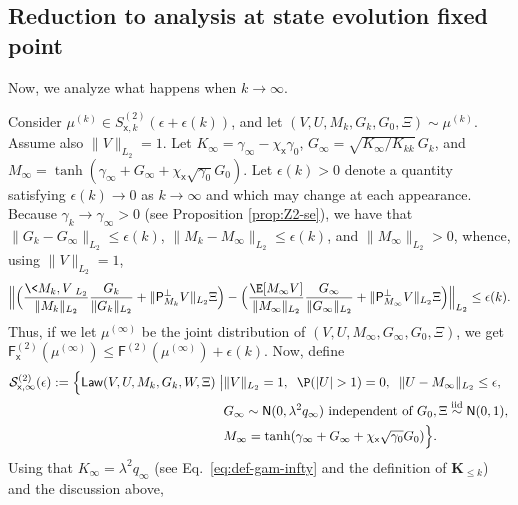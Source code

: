 \documentclass[]{article}
\def\sx{{\mathsf x}}
\def\normal{{\sf N}}
\def\proj{{\mathsf P}}
\def\proj{{\mathsf P}}
\def\normal{{\sf N}}
\def\cS{{\mathcal S}}
\def\cS{{\mathcal S}}
\def\bK{\boldsymbol{K}}
\def\sF{\mathsf{F}}
\def\Law{\mathsf{Law}}
\begin{document}
\subsection{Reduction to analysis at state evolution fixed point}

Now, we analyze what happens when $k \rightarrow \infty$.

Consider $\mu^{(k)} \in S^{(2)}_{\sx,k}(\epsilon + \epsilon(k))$,
and let $(V,U,M_k,G_k,G_0,\Xi) \sim \mu^{(k)}$.
Assume also $\| V \|_{L_2} = 1$.
Let $K_\infty = \gamma_\infty - \chi_{\sx} \gamma_0$,
$G_\infty = \sqrt{K_\infty/K_{kk}}\, G_k$,
and $M_\infty = \tanh(\gamma_\infty + G_\infty + \chi_{\sx} \sqrt{\gamma_0}G_0)$.
Let $\epsilon(k) > 0$ denote a quantity satisfying $\epsilon(k) \rightarrow 0$ as $k\rightarrow \infty$
and which may change at each appearance.
Because $\gamma_k \rightarrow \gamma_\infty > 0$ (see Proposition \ref{prop:Z2-se}),
we have that $\| G_k - G_\infty \|_{L_2} \leq \epsilon(k)$, $\| M_k - M_\infty \|_{L_2} \leq \epsilon(k)$, and $\| M_\infty \|_{L_2} > 0$,
whence, using $\|V\|_{L_2} = 1$,
\begin{equation}
    \Big\|
        \Big(\frac{\<M_k,V\>_{L_2}}{\| M_k \|_{L_2}} \frac{G_k}{\|G_k\|_{L_2}} + \| \proj_{M_k}^\perp V \|_{L_2} \Xi\Big)
        -
        \Big(\frac{\E[M_\infty V]}{\| M_\infty \|_{L_2}} \frac{G_\infty}{\|G_\infty\|_{L_2}} + \| \proj_{M_\infty}^\perp V \|_{L_2} \Xi\Big)
    \Big\|_{L_2} \leq \epsilon(k).
\end{equation}
Thus, if we let $\mu^{(\infty)}$ be the joint distribution of $(V,U,M_\infty,G_\infty,G_0,\Xi)$,
we get $\sF_{\sx}^{(2)}(\mu^{(\infty)}) \leq \sF^{(2)}(\mu^{(\infty)}) + \epsilon(k)$.
Now, define
\begin{equation}
\begin{aligned}
    \cS^{(2)}_{\sx,\infty}(\epsilon)
        := 
        \Big\{
            \Law(V,U,M_k,G_k,W,\Xi)
            \bigm|
            &\| V \|_{L_2} = 1,\;\;
            \P(|U| > 1) = 0,\;\;
            \|U - M_\infty \|_{L_2} \leq \epsilon,\,
        \\
            &G_\infty \sim \normal(0,\lambda^2 q_\infty) \text{ independent of } G_0,\Xi \stackrel{\mathrm{iid}}\sim \normal(0,1),\,
        \\
            &M_\infty = \tanh(\gamma_\infty + G_\infty + \chi_{\sx} \sqrt{\gamma_0}G_0)
        \Big\}.
\end{aligned}
\end{equation}
Using that $K_\infty = \lambda^2 q_\infty$ (see Eq.~\eqref{eq:def-gam-infty} and the definition of $\bK_{\leq k}$) and the discussion above,
\end{document}
